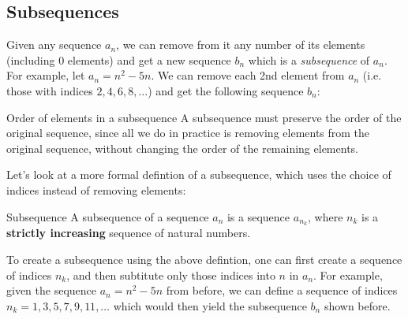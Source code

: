 \subsection{Subsequences}
Given any sequence $a_{n}$, we can remove from it any number of its elements (including $0$ elements) and get a new sequence $b_{n}$ which is a \emph{subsequence} of $a_{n}$. For example, let $a_{n}=n^{2}-5n$. We can remove each 2nd element from $a_{n}$ (i.e. those with indices $2,4,6,8,\ldots$) and get the following sequence $b_{n}$:


\begin{note}{Order of elements in a subsequence}{}
	A subsequence must preserve the order of the original sequence, since all we do in practice is removing elements from the original sequence, without changing the order of the remaining elements.
\end{note}

Let's look at a more formal defintion of a subsequence, which uses the choice of indices instead of removing elements:
\begin{definition}{Subsequence}{}
	A subsequence of a sequence $a_{n}$ is a sequence $a_{n_{k}}$, where $n_{k}$ is a \textbf{strictly increasing} sequence of natural numbers.
\end{definition}

To create a subsequence using the above defintion, one can first create a sequence of indices $n_{k}$, and then subtitute only those indices into $n$ in $a_{n}$. For example, given the sequence $a_{n}=n^{2}-5n$ from before, we can define a sequence of indices $n_{k}=1,3,5,7,9,11,\dots$ which would then yield the subsequence $b_{n}$ shown before.

